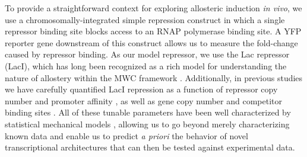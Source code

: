   To provide a straightforward context for exploring allosteric induction
\textit{in vivo}, we use a chromosomally-integrated simple repression construct
in which a single repressor binding site blocks access to an RNAP polymerase
binding site. A YFP reporter gene downstream of this construct allows us to
measure the fold-change caused by repressor binding. As our model repressor, we
use the Lac repressor (LacI), which has long been recognized as a rich model
for understanding the nature of allostery within the MWC framework
\cite{Daly1986, Dunaway1980, Meyer2013, Daber2007, Daber2009,
	Muller-Hartmann1996, OGorman1980, Sharp2011, Taraban2008, Wilson2007}.
Additionally, in previous studies we have carefully quantified LacI repression
as a function of repressor copy number and promoter affinity \cite{Garcia2011},
as well as gene copy number and competitor binding sites \cite{Weinert2014}. All
of these tunable parameters have been well characterized by statistical
mechanical models \cite{Bintu2005, Bintu2005a}, allowing us to go beyond merely
characterizing known data and enable us to predict \textit{a priori} the
behavior of novel transcriptional architectures that can then be tested against
experimental data. 

